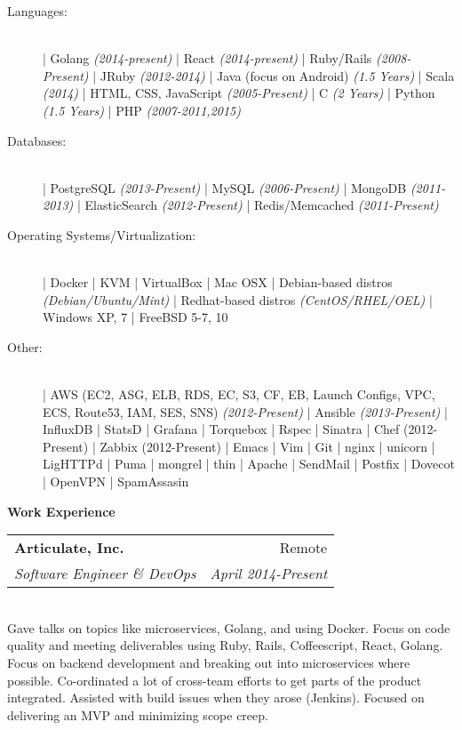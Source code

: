 \documentclass[a4paper,11pt,sans]{article}
\makeatletter
\newcommand{\resheading}[1]{{\large \colorbox{myblue}{\begin{minipage}{\textwidth}{\textbf{#1 \vphantom{p\^{E}}}}\end{minipage}}}}
\newcommand{\ressubheading}[4]{
\begin{tabular*}{7.0in}{l@{\extracolsep{\fill}}r}
		\textbf{#1} & #2 \\
		\textit{#3} & \textit{#4} \\
\end{tabular*}\vspace{-6pt}}
\makeatother
\begin{document}
\begin{description}
    \item[Languages:] \hfill \\
        | Golang \textit{(2014-present)}
        | React \textit{(2014-present)}
        | Ruby/Rails \textit{(2008-Present)}
        | JRuby \textit{(2012-2014)}
        | Java (focus on Android) \textit{(1.5 Years)}
        | Scala \textit{(2014)}
        | HTML, CSS, JavaScript \textit{(2005-Present)}
        | C \textit{(2 Years)}
        | Python \textit{(1.5 Years)}
        | PHP \textit{(2007-2011,2015)}
    \item[Databases:] \hfill  \\
        | PostgreSQL \textit{(2013-Present)}
        | MySQL \textit{(2006-Present)}
        | MongoDB \textit{(2011-2013)}
        | ElasticSearch \textit{(2012-Present)}
        | Redis/Memcached \textit{(2011-Present)}
    \item[Operating Systems/Virtualization:] \hfill \\
        | Docker
        | KVM
        | VirtualBox
        | Mac OSX
        | Debian-based distros \textit{(Debian/Ubuntu/Mint)}
        | Redhat-based distros \textit{(CentOS/RHEL/OEL)}
        | Windows XP, 7
        | FreeBSD 5-7, 10
    \item[Other:] \hfill \\
        | AWS (EC2, ASG, ELB, RDS, EC, S3, CF, EB, Launch Configs, VPC, ECS, Route53, IAM, SES, SNS) \textit{(2012-Present)}
        | Ansible \textit{(2013-Present)}
        | InfluxDB
        | StatsD
        | Grafana
        | Torquebox
        | Rspec
        | Sinatra
        | Chef (2012-Present)
        | Zabbix (2012-Present)
        | Emacs
        | Vim
        | Git
        | nginx
        | unicorn
        | LigHTTPd
        | Puma
        | mongrel
        | thin
        | Apache
        | SendMail
        | Postfix
        | Dovecot
        | OpenVPN
        | SpamAssasin

\end{description}

\resheading{\color{white} Work Experience}

\ressubheading{Articulate, Inc.}{Remote}{Software Engineer \& DevOps}{April 2014-Present}

\hspace{5pt} \\

Gave talks on topics like microservices, Golang, and using Docker. Focus on code quality and meeting deliverables using Ruby, Rails, Coffeescript, React, Golang. Focus on backend development and breaking out into microservices where possible. Co-ordinated a lot of cross-team efforts to get parts of the product integrated. Assisted with build issues when they arose (Jenkins). Focused on delivering an MVP and minimizing scope creep.
\end{document}
